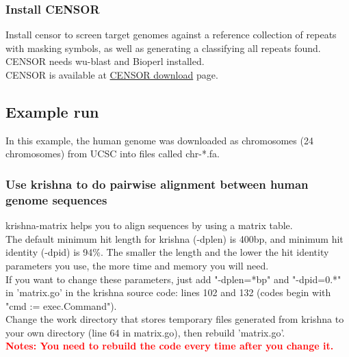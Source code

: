 \documentclass[12pt]{report}
\begin{document}
\subsubsection*{ Install CENSOR}
Install censor to screen target genomes against a reference collection of repeats with masking symbols, as well as generating a 
classifying all repeats found. CENSOR needs wu-blast and Bioperl installed.\\

\noindent CENSOR is available at \href{http://www.girinst.org/downloads/software/censor/} {\color{blue}CENSOR download} page.



\subsection*{Example run}
In this example, the human genome was downloaded as chromosomes (24 chromosomes) from UCSC into files called chr-*.fa.\\

\subsubsection*{Use krishna to do pairwise alignment between human genome sequences}

krishna-matrix helps you to align sequences by using a matrix table. \\

\noindent The default minimum hit length for krishna (-dplen) is 400bp, and minimum hit identity (-dpid) is 94\%. The smaller the length and the lower the hit identity parameters you use, the more time and memory you will need. \\

\noindent If you want to change these parameters, just add "-dplen=*bp" and "-dpid=0.*" in 'matrix.go' in the krishna source code: lines 102 and 132 (codes begin with "cmd := exec.Command").\\

\noindent Change the work directory that stores temporary files generated from krishna to your own directory (line 64 in matrix.go), then rebuild 'matrix.go'. \\

\noindent\textbf{\textcolor{red}{Notes: You need to rebuild the code every time after you change it. }} \\
\end{document}
